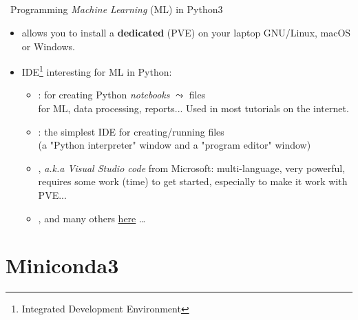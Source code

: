 \documentclass[10pt,serif,mathserif,compress,hyperref={colorlinks}]{beamer}
\title[\hspace*{.75\linewidth}\insertframenumber/\inserttotalframenumber]
      {\fontsize{17}{17}\selectfont{\textbf{Machine learning with Python:\\Create, install \& use a \\Python Virtual Environment (PVE)}}\\[6mm]
      \fontsize{12}{12}\selectfont{\textbf{DuMAS department day -- 2023/09/22}}
}
\subtitle{}
\author[{\tiny{JLC -- Sept23 -- v1.1 }}

\hspace*{.75\linewidth}]
{\fontsize{9}{9}\selectfont{\hspace*{-5mm}Jean-Luc.Charles@mailo.com}}
\institute{}
\date{}
\begin{document}
\frame[plain]{\titlepage}



\begin{frame}
  
  \begin {bclogo}[noborder=true, couleur=gray!50, couleurBarre=Chocolate, logo=\bctrombone, marge=0, margeG=-0.5]
      {\ Programming {\em Machine Learning} (ML) in Python3}
      \medskip
      \begin{itemize}
      \item {} allows you to install a {\bf dedicated}  (PVE) on your laptop
        GNU/Linux, macOS or Windows.\medskip
      \item IDE\footnote{Integrated Development Environment} interesting for ML in Python:
        \begin{itemize}
        \item {}: for creating Python {\em notebooks} $\leadsto$ files \\ for ML, data processing, reports... 
          Used in most tutorials on the internet.\medskip
        \item {}: the simplest IDE for creating/running  files\\
          (a "Python interpreter" window and a "program editor" window)\medskip
        \item {}, {\em a.k.a Visual Studio code} from Microsoft: multi-language, very powerful, requires some work (time) to get started,
          especially to make it work with PVE...\medskip
        \item {},  and many others \href{https://wiki.python.org/moin/IntegratedDevelopmentEnvironments}{here} \ldots
        \end{itemize}
      \end{itemize}
      \medskip
  \end{bclogo}
  
\end{frame}

\section{Miniconda3}
\end{document}
